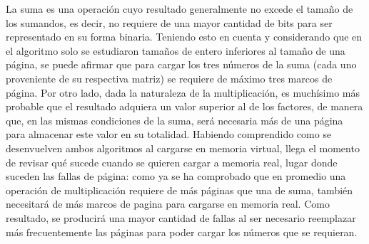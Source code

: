 \documentclass[a4paper]{article}
\begin{document}
La suma es una operación cuyo resultado generalmente no excede el 
tamaño de los sumandos, es decir, no requiere de una mayor cantidad de 
bits para ser representado en su forma binaria. Teniendo esto en cuenta 
y considerando que en el algoritmo solo se estudiaron tamaños de entero inferiores al tamaño de una página, se puede afirmar que para cargar los tres números de la suma (cada uno proveniente de su respectiva matriz) se requiere de máximo tres marcos de página.  Por otro lado, dada la naturaleza de la multiplicación, 
es muchísimo más probable que el resultado adquiera un valor superior al de los factores, de manera que, en las mismas condiciones de la suma, será necesaria más de una página para almacenar este valor en su totalidad. 
Habiendo comprendido como se desenvuelven ambos algoritmos al cargarse en memoria virtual, llega el momento de revisar qué sucede cuando se quieren cargar a memoria real, lugar donde suceden las fallas de página: como ya se ha comprobado que en promedio una operación de multiplicación requiere de más páginas que una de suma, también necesitará de más marcos de pagina para cargarse en memoria real. Como resultado, se producirá una mayor cantidad de fallas al ser necesario reemplazar más frecuentemente las páginas para poder cargar los números que se requieran.
\end{document}

